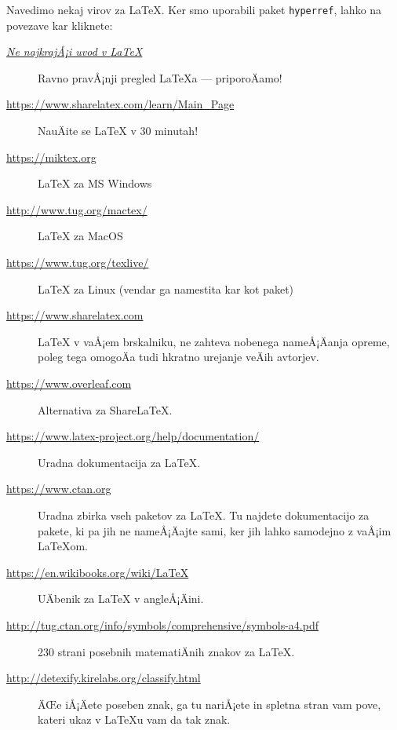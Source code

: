 \documentclass[a4paper]{article}
\begin{document}
Navedimo nekaj virov za {\LaTeX}. Ker smo uporabili paket \texttt{hyperref}, lahko na povezave kar kliknete:
%
\begin{description}
\item[\href{http://www-lp.fmf.uni-lj.si/plestenjak/vaje/latex/lshort.pdf}{\emph{Ne najkrajÅ¡i uvod v {\LaTeX}}}]
  Ravno pravÅ¡nji pregled {\LaTeX}a --- priporoÄamo!

\item[\url{https://www.sharelatex.com/learn/Main_Page}]
  NauÄite se LaTeX v 30 minutah!

\item[\url{https://miktex.org}] LaTeX za MS Windows

\item[\url{http://www.tug.org/mactex/}] LaTeX za MacOS

\item[\url{https://www.tug.org/texlive/}] LaTeX za Linux (vendar ga namestita kar kot paket)

\item[\url{https://www.sharelatex.com}] LaTeX v vaÅ¡em brskalniku, ne zahteva nobenega
  nameÅ¡Äanja opreme, poleg tega omogoÄa tudi hkratno urejanje veÄih avtorjev.

\item[\url{https://www.overleaf.com}]
  Alternativa za ShareLaTeX.

\item[\url{https://www.latex-project.org/help/documentation/}]
  Uradna dokumentacija za {\LaTeX}.

\item[\url{https://www.ctan.org}] Uradna zbirka vseh paketov za {\LaTeX}. Tu najdete
  dokumentacijo za pakete, ki pa jih ne nameÅ¡Äajte sami, ker jih lahko samodejno z vaÅ¡im
  LaTeXom.

\item[\url{https://en.wikibooks.org/wiki/LaTeX}]
  UÄbenik za LaTeX v angleÅ¡Äini.

\item[\url{http://tug.ctan.org/info/symbols/comprehensive/symbols-a4.pdf}]
  230 strani posebnih matematiÄnih znakov za {\LaTeX}.

\item[\url{http://detexify.kirelabs.org/classify.html}] ÄŒe iÅ¡Äete poseben znak, ga tu
  nariÅ¡ete in spletna stran vam pove, kateri ukaz v {\LaTeX}u vam da tak znak.
\end{description}
\end{document}
